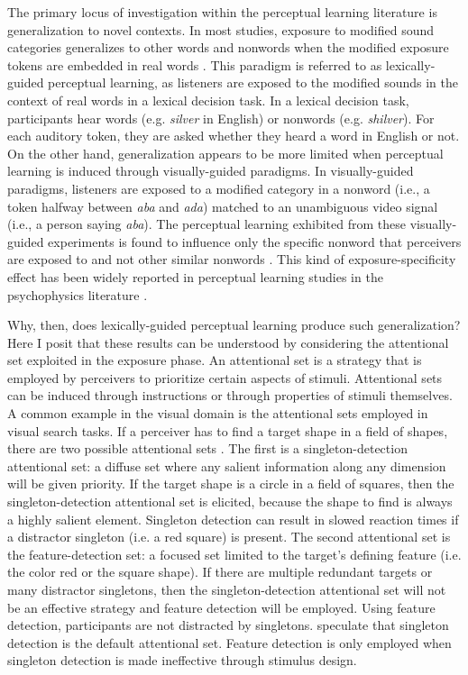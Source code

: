 The primary locus of investigation within the perceptual learning literature is generalization to novel contexts.
In most studies, exposure to modified sound categories generalizes to other words and nonwords when the modified exposure tokens are embedded in real words \citep{Norris2003, Reinisch2013}.  
This paradigm is referred to as lexically-guided perceptual learning, as listeners are exposed to the modified sounds in the context of real words in a lexical decision task.
In a lexical decision task, participants hear words (e.g. \emph{silver} in English) or nonwords (e.g. \emph{shilver}).
For each auditory token, they are asked whether they heard a word in English or not.
On the other hand, generalization appears to be more limited when perceptual learning is induced through visually-guided paradigms.
In visually-guided paradigms, listeners are exposed to a modified category in a nonword (i.e., a token halfway between \emph{aba} and \emph{ada}) matched to an unambiguous video signal (i.e., a person saying \emph{aba}).  
The perceptual learning exhibited from these visually-guided experiments is found to influence only the specific nonword that perceivers are exposed to and not other similar nonwords \citep{Reinisch2014}.  
This kind of exposure-specificity effect has been widely reported in perceptual learning studies in the psychophysics literature \citep[for review]{Gibson1953}.

Why, then, does lexically-guided perceptual learning produce such generalization?
Here I posit that these results can be understood by considering the attentional set exploited in the exposure phase.
An attentional set is a strategy that is employed by perceivers to prioritize certain aspects of stimuli.
Attentional sets can be induced through instructions or through properties of stimuli themselves.
A common example in the visual domain is the attentional sets employed in visual search tasks.
If a perceiver has to find a target shape in a field of shapes, there are two possible attentional sets \citep{Bacon1994}.
The first is a singleton-detection attentional set:  a diffuse set where any salient information along any dimension will be given priority.
If the target shape is a circle in a field of squares, then the singleton-detection attentional set is elicited, because the shape to find is always a highly salient element.
Singleton detection can result in slowed reaction times if a distractor singleton (i.e. a red square) is present.
The second attentional set is the feature-detection set: a focused set limited to the target's defining feature (i.e. the color red or the square shape).
If there are multiple redundant targets or many distractor singletons, then the singleton-detection attentional set will not be an effective strategy and feature detection will be employed.
Using feature detection, participants are not distracted by singletons.
\citet{Bacon1994} speculate that singleton detection is the default attentional set.
Feature detection is only employed when singleton detection is made ineffective through stimulus design.

